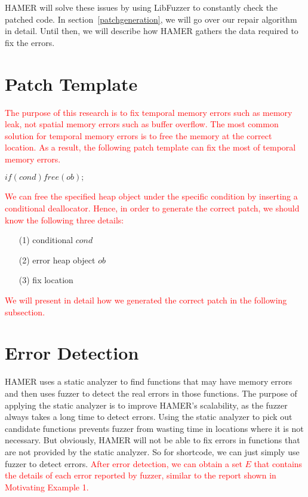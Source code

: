 \documentclass[a4paper,11pt,oneside,openany]{book}
\begin{document}
HAMER will solve these issues by using LibFuzzer to constantly check the patched code. In section~\ref{patchgeneration}, we will go over our repair algorithm in detail. Until then, we will describe how HAMER gathers the data required to fix the errors.

\section{Patch Template}
\textcolor{red}{
The purpose of this research is to fix temporal memory errors such as memory leak, not spatial memory errors such as buffer overflow. The most common solution for temporal memory errors is to free the memory at the correct location. As a result, the following patch template can fix the most of temporal memory errors.
}

\begin{minipage}{\textwidth}
    \vspace{0.2cm}
    \textsl{\hspace{0.3cm}$if ( cond ) free ( ob );$\\}
\end{minipage}
\textcolor{red}{
We can free the specified heap object under the specific condition by inserting a conditional deallocator. Hence, in order to generate the correct patch, we should know the following three details:}
\begin{itemize}
  \item[(1)] conditional $cond$
  \item[(2)] error heap object $ob$
  \item[(3)] fix location
\end{itemize}
\textcolor{red}{
We will present in detail how we generated the correct patch in the following subsection.
}

\section{Error Detection}
HAMER uses a static analyzer to find functions that may have memory errors and then uses fuzzer to detect the real errors in those functions. The purpose of applying the static analyzer is to improve HAMER's scalability, as the fuzzer always takes a long time to detect errors. Using the static analyzer to pick out candidate functions prevents fuzzer from wasting time in locations where it is not necessary. But obviously, HAMER will not be able to fix errors in functions that are not provided by the static analyzer. So for shortcode, we can just simply use fuzzer to detect errors. \textcolor{red}{After error detection, we can obtain a set $E$ that contains the details of each error reported by fuzzer, similar to the report shown in Motivating Example 1.}
\end{document}
